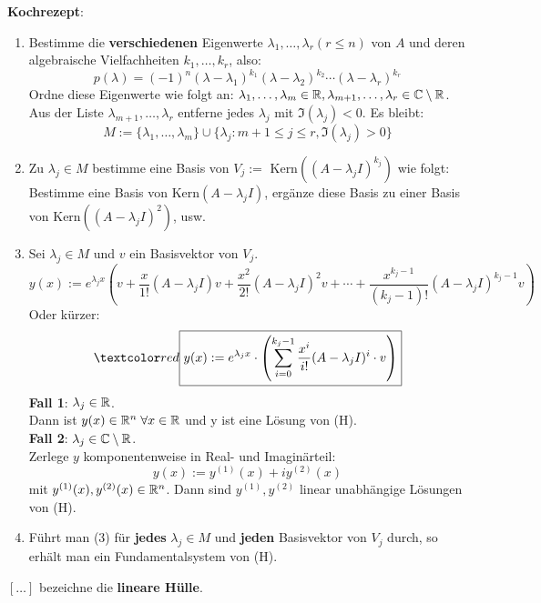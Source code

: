 \documentclass[a4paper,oneside,DIV15,BCOR12mm,chapterprefix=true,headings=onelinechapter]{scrbook}
\begin{document}
\textbf{Kochrezept}:
\begin{enumerate}
\item Bestimme die \textbf{verschiedenen} Eigenwerte $\lambda_1, \ldots, \lambda_r (r \le n)$ 
von $A$ und deren algebraische Vielfachheiten $k_1, \ldots, k_r$, also: 
\[p(\lambda) = (-1)^n (\lambda - \lambda_1)^{k_1} (\lambda - \lambda_2)^{k_2} \cdots (\lambda - \lambda_r)^{k_r}\] 
Ordne diese Eigenwerte wie folgt an: $\lambda_1, \ldots, \lambda_m \in \mathbb{R}, \lambda_{m+1}, \ldots, \lambda_r \in \mathbb{C} \setminus \mathbb{R}$.\\ 
Aus der Liste $\lambda_{m+1}, \ldots, \lambda_r$ entferne jedes $\lambda_j$ mit 
$\Im(\lambda_j) < 0$. Es bleibt: 
\[M := \{\lambda_1, \ldots, \lambda_m\} \cup \{\lambda_j : m + 1 \le j \le r, \Im(\lambda_j) > 0 \}\]

\item Zu $\lambda_j \in M$ bestimme eine Basis von $V_j := $ Kern$((A-\lambda_j I)^{k_j})$ 
wie folgt: Bestimme eine Basis von Kern$(A-\lambda_j I)$, ergänze diese Basis zu 
einer Basis von Kern$((A-\lambda_j I)^2)$, usw.

\item Sei $\lambda_j \in M$ und $v$ ein Basisvektor von $V_j$. \\
\[y(x) := e^{\lambda_j x} (v+\frac{x}{1!} (A-\lambda_j I)v + \frac{x^2}{2!} (A-\lambda_j I)^2 v + \cdots + \frac{x^{k_j - 1}}{ (k_j - 1)! } (A - \lambda_j I)^{k_j - 1} v )\]
Oder kürzer:
\[\importantbox{y(x) := e^{\lambda_j x} \cdot \left ( \sum_{i=0}^{k_j-1} \frac{x^i}{i!} (A - \lambda_j I)^i \cdot v \right )}\]
\textbf{Fall 1}: $\lambda_j \in \mathbb{R}$.\\
Dann ist $y(x) \in \mathbb{R}^n \; \forall x \in \mathbb{R}$ und y ist eine Lösung von (H). \\
\textbf{Fall 2}: $\lambda_j \in \mathbb{C} \setminus \mathbb{R}$.\\
Zerlege $y$ komponentenweise in Real- und Imaginärteil: 
\[y(x) := y^{(1)}(x) + i y^{(2)}(x)\]
mit $y^{(1)}(x),y^{(2)}(x)\in\mathbb{R}^n$. Dann sind $y^{(1)}, y^{(2)}$ linear unabhängige Lösungen von (H).

\item Führt man (3) für \textbf{jedes} $\lambda_j \in M$ und \textbf{jeden} Basisvektor von $V_j$ durch, so erhält man ein Fundamentalsystem von (H).
\end{enumerate}

\begin{definition}
$ [\ldots] $ bezeichne die \textbf{lineare Hülle}.
\end{definition}
\end{document}
